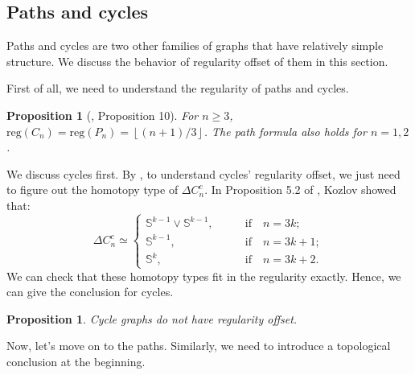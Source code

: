\documentclass[dvipsnames,10pt]{article}
\newtheorem{proposition}[theorem]{Proposition}
\begin{document}
\subsection{Paths and cycles}
Paths and cycles are two other families of graphs that have relatively simple structure. We discuss the behavior of regularity offset of them in this section.

First of all, we need to understand the regularity of paths and cycles.

\begin{proposition}[\cite{woodroofe2014matchings}, Proposition 10]

For $n\geq3$, $\mathrm{reg}(C_n)=\mathrm{reg}(P_n)=\left\lfloor(n+1)/3\right\rfloor$. The path formula also holds for $n=1,2$.

\end{proposition}
We discuss cycles first. By , to understand cycles' regularity offset, we just need to figure out the homotopy type of $\Delta C_n^c$. In Proposition 5.2 of \cite{kozlov1999complexes}, Kozlov showed that:
\begin{equation*}
    \Delta C_n^c\simeq\left\{\begin{matrix}
 \mathbb{S}^{k-1}\vee \mathbb{S}^{k-1},\qquad &\text{if}\quad  n=3k;\\
 \mathbb{S}^{k-1},\qquad &\text{if}\quad  n=3k+1;\\
 \mathbb{S}^k,\qquad &\text{if}\quad  n=3k+2.
\end{matrix}\right.
\end{equation*}
We can check that these homotopy types fit in the regularity exactly. Hence, we can give the conclusion for cycles.

\begin{proposition}
    Cycle graphs do not have regularity offset.
\end{proposition}
Now, let's move on to the paths. Similarly, we need to introduce a topological conclusion at the beginning.
\end{document}
